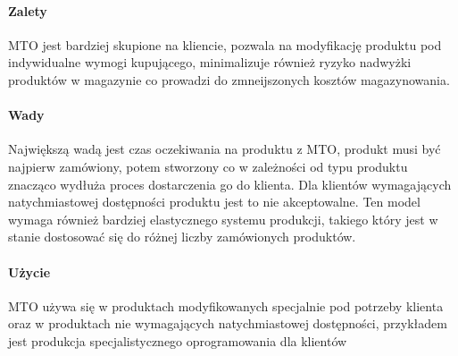 \documentclass[12pt]{scrartcl}
\begin{document}
		\paragraph{Zalety} MTO jest bardziej skupione na kliencie, pozwala na modyfikację produktu pod indywidualne wymogi kupującego, minimalizuje również ryzyko nadwyżki produktów w magazynie co prowadzi do zmneijszonych kosztów magazynowania. 
		\paragraph{Wady} Największą wadą jest czas oczekiwania na produktu z MTO, produkt musi być najpierw zamówiony, potem stworzony co w zależności od typu produktu znacząco wydłuża proces dostarczenia go do klienta. Dla klientów wymagających natychmiastowej dostępności produktu jest to nie akceptowalne. Ten model wymaga również bardziej elastycznego systemu produkcji, takiego który jest w stanie dostosować się do różnej liczby zamówionych produktów.
		\paragraph{Użycie} MTO używa się w produktach modyfikowanych specjalnie pod potrzeby klienta oraz w produktach nie wymagających natychmiastowej dostępności, przykładem jest produkcja specjalistycznego oprogramowania dla klientów
\end{document}

